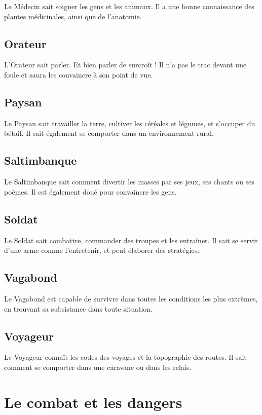 \documentclass[10pt,twoside,twocolumn,openany,bg=print,justified]{dndbook}
\begin{document}
Le Médecin sait soigner les gens et les animaux. Il a une bonne connaissance des plantes médicinales, ainsi que de l'anatomie.

\subsection*{Orateur}

L'Orateur sait parler. Et bien parler de surcroît ! Il n'a pas le trac devant une foule et saura les convaincre à son point de vue.

\subsection*{Paysan}

Le Paysan sait travailler la terre, cultiver les céréales et légumes, et s'occuper du bétail. Il sait également se comporter dans un environnement rural.

\subsection*{Saltimbanque}

Le Saltimbanque sait comment divertir les masses par ses jeux, ses chants ou ses poèmes. Il est également doué pour convaincre les gens.

\subsection*{Soldat}

Le Soldat sait combattre, commander des troupes et les entraîner. Il sait se servir d'une arme comme l'entretenir, et peut élaborer des stratégies.

\subsection*{Vagabond}

Le Vagabond est capable de survivre dans toutes les conditions les plus extrêmes, en trouvant sa subsistance dans toute situation.

\subsection*{Voyageur}

Le Voyageur connaît les codes des voyages et la topographie des routes. Il sait comment se comporter dans une caravane ou dans les relais.
\newpage
\section{Le combat et les dangers}
\end{document}
